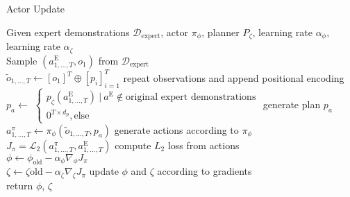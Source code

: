 \begin{algorithm}
    \caption{Actor Update}
    \label{Actor_Update_Alg}
    Given expert demonstrations $\mathcal{D}_{\text{expert}}$, actor $\pi_{\phi}$, planner $P_{\zeta}$, 
    learning rate $\alpha_{\phi}$, learning rate $\alpha_{\zeta}$\\
     Sample $(a^{\text{E}}_{1, ..., T}, o_1)$ from $\mathcal{D}_{\text{expert}}$\\
    $\tilde{o}_{1, ..., T} \gets [o_1]^T \oplus [p_i]_{i=1}^T$ \hfill{repeat observations and append positional encoding} \\
    $p_a \gets $
    $\begin{cases}
        p_{\zeta}(a^{\text{E}}_{1, ..., T})\ |\ a^{\text{E}} \notin \text{original expert demonstrations}\\
        0^{T \times d_p}, \text{else}
    \end{cases}$ \hfill {generate plan $p_a$} \\
    $a^\pi_{1,...,T} \gets \pi_{\phi}(\tilde{o}_{1, ..., T}, p_a)$ \hfill{generate actions according to $\pi_{\phi}$} \\
    $J_{\pi} = \mathcal{L}_2(a^\pi_{1,...,T}, a^{\text{E}}_{1, ..., T})$ \hfill{compute $L_2$ loss from actions} \\
    $\phi \gets \phi_{\mathrm{old}} - \alpha_{\phi} \nabla_{\phi}J_{\pi}$\\
    $\zeta \gets \zeta{\mathrm{old}} - \alpha_{\zeta} \nabla_{\zeta}J_{\pi}$ \hfill {update $\phi$ and $\zeta$ according to gradients} \\
    return $\phi$, $\zeta$
\end{algorithm}

